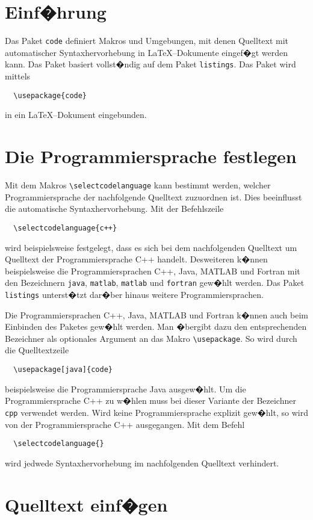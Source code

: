 \section{Einf�hrung}
Das Paket \verb|code| definiert Makros und Umgebungen, mit denen Quelltext mit automatischer Syntaxhervorhebung in \LaTeX--Dokumente eingef�gt werden kann. Das Paket basiert vollst�ndig auf dem Paket \verb|listings|. Das Paket wird mittels
\begin{verbatim}
  \usepackage{code}
\end{verbatim}
in ein \LaTeX--Dokument eingebunden.


\section{Die Programmiersprache festlegen}
Mit dem Makros \verb|\selectcodelanguage| kann bestimmt werden, welcher Programmiersprache der nachfolgende Quelltext zuzuordnen ist. Dies beeinflusst die automatische Syntaxhervorhebung. Mit der Befehlszeile
\begin{verbatim}
  \selectcodelanguage{c++}
\end{verbatim}
wird beispielsweise festgelegt, dass es sich bei dem nachfolgenden Quelltext um Quelltext der Programmiersprache C++ handelt. Desweiteren k�nnen beispielsweise die Programmiersprachen C++, Java, MATLAB und Fortran mit den Bezeichnern \verb|java|, \verb|matlab|, \verb|matlab| und \verb|fortran| gew�hlt werden. Das Paket \verb|listings| unterst�tzt dar�ber hinaus weitere Programmiersprachen. 

Die Programmiersprachen C++, Java, MATLAB und Fortran k�nnen auch beim Einbinden des Paketes gew�hlt werden. Man �bergibt dazu den entsprechenden Bezeichner als optionales Argument an das Makro \verb|\usepackage|. So wird durch die Quelltextzeile
\begin{verbatim}
  \usepackage[java]{code}
\end{verbatim}
beispielsweise die Programmiersprache Java ausgew�hlt. Um die Programmiersprache C++ zu w�hlen muss bei dieser Variante der Bezeichner \verb|cpp| verwendet werden. Wird keine Programmiersprache explizit gew�hlt, so wird von der Programmiersprache C++ ausgegangen. Mit dem Befehl
\begin{verbatim}
  \selectcodelanguage{}
\end{verbatim}
wird jedwede Syntaxhervorhebung im nachfolgenden Quelltext verhindert. 




\section{Quelltext einf�gen}

